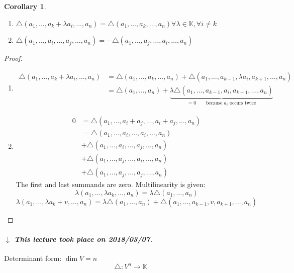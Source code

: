 \documentclass[a4paper]{article}
\newcounter{lecref}[section]
\numberwithin{lecref}{section}
\newtheorem{corollary}[lecref]{Corollary}
\newcommand{\dateref}[1]{%
  \begin{mdframed}[backgroundcolor=gray!10,innerbottommargin=0pt,innertopmargin=0pt]
    \paragraph{\textit{$\downarrow$ This lecture took place on #1.}}%
  \end{mdframed}%
}
\begin{document}
\begin{corollary} %
  \begin{enumerate}
    \item[4.]
      $\triangle(a_1, \dots, a_k + \lambda a_i, \dots, a_n) = \triangle(a_1, \dots, a_k, \dots, a_n) \forall \lambda \in \mathbb K, \forall i \neq k$
    \item[5.]
      $\triangle(a_1, \dots, a_i, \dots, a_j, \dots, a_n) = -\triangle(a_1, \dots, a_j, \dots, a_i, \dots, a_n)$
  \end{enumerate}
\end{corollary}
\begin{proof}
  \begin{enumerate}
    \item[4.]
      \begin{align*}
        \triangle(a_1, \dots, a_k + \lambda a_i, \dots, a_n)
          &= \triangle (a_1, \dots, a_k, \dots, a_n) + \triangle (a_1, \dots, a_{k-1}, \lambda a_i, a_{k+1}, \dots, a_n) \\
          &= \triangle (a_1, \dots, a_n) + \underbrace{\lambda \triangle (a_1, \dots, a_{k-1}, a_i, a_{k+1}, \dots, a_n)}_{= 0 \qquad \text{because $a_i$ occurs twice}}
      \end{align*}
    \item[5.]
      \begin{align*}
        0 &= \triangle(a_1, \dots, a_i + a_j, \dots, a_i + a_j, \dots, a_n) \\
          &= \triangle(a_1, \dots, a_i, \dots, a_i, \dots, a_n) \\
          &+ \triangle(a_1, \dots, a_i, \dots, a_j, \dots, a_n) \\
          &+ \triangle(a_1, \dots, a_j, \dots, a_i, \dots, a_n) \\
          &+ \triangle(a_1, \dots, a_j, \dots, a_j, \dots, a_n)
      \end{align*}
      The first and last summands are zero. Multilinearity is given:
      \[ \lambda(a_1, \dots, \lambda a_k, \dots, a_n) = \lambda \triangle (a_1, \dots, a_n) \]
      \[ \lambda(a_1, \dots, \lambda a_k + v, \dots, a_n) = \lambda \triangle (a_1, \dots, a_n) + \triangle (a_1, \dots, a_{k-1}, v, a_{k+1}, \dots, a_n) \]
  \end{enumerate}
\end{proof}

\dateref{2018/03/07}

Determinant form: $\dim{V} = n$
\[ \triangle: V^n \to \mathbb K \]
\end{document}

